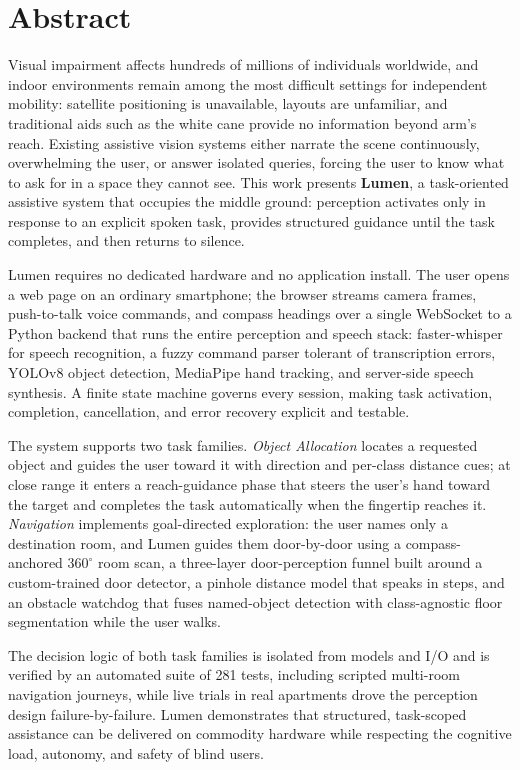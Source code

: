 \chapter*{Abstract}

Visual impairment affects hundreds of millions of individuals worldwide, and indoor
environments remain among the most difficult settings for independent mobility:
satellite positioning is unavailable, layouts are unfamiliar, and traditional aids
such as the white cane provide no information beyond arm's reach. Existing assistive
vision systems either narrate the scene continuously, overwhelming the user, or answer
isolated queries, forcing the user to know what to ask for in a space they cannot see. This work presents \textbf{Lumen}, a
task-oriented assistive system that occupies the middle ground: perception activates
only in response to an explicit spoken task, provides structured guidance until the
task completes, and then returns to silence.

Lumen requires no dedicated hardware and no application install. The user opens a web
page on an ordinary smartphone; the browser streams camera frames, push-to-talk voice
commands, and compass headings over a single WebSocket to a Python backend that runs
the entire perception and speech stack: faster-whisper for speech recognition, a
fuzzy command parser tolerant of transcription errors, YOLOv8 object detection,
MediaPipe hand tracking, and server-side speech synthesis. A finite state machine
governs every session, making task activation, completion, cancellation, and error
recovery explicit and testable.

The system supports two task families. \emph{Object Allocation} locates a requested
object and guides the user toward it with direction and per-class distance cues; at
close range it enters a reach-guidance phase that steers the user's hand toward the
target and completes the task automatically when the fingertip reaches it.
\emph{Navigation} implements goal-directed exploration: the user names only a
destination room, and Lumen guides them door-by-door using a compass-anchored
$360^\circ$ room scan, a three-layer door-perception funnel built around a
custom-trained door detector, a pinhole distance model that speaks in steps, and an
obstacle watchdog that fuses named-object detection with class-agnostic floor
segmentation while the user walks.

The decision logic of both task families is isolated from models and I/O and is verified
by an automated suite of 281 tests, including scripted multi-room navigation
journeys, while live trials in real apartments drove the perception design
failure-by-failure. Lumen demonstrates that structured, task-scoped assistance can be delivered on commodity hardware while respecting
the cognitive load, autonomy, and safety of blind users.

